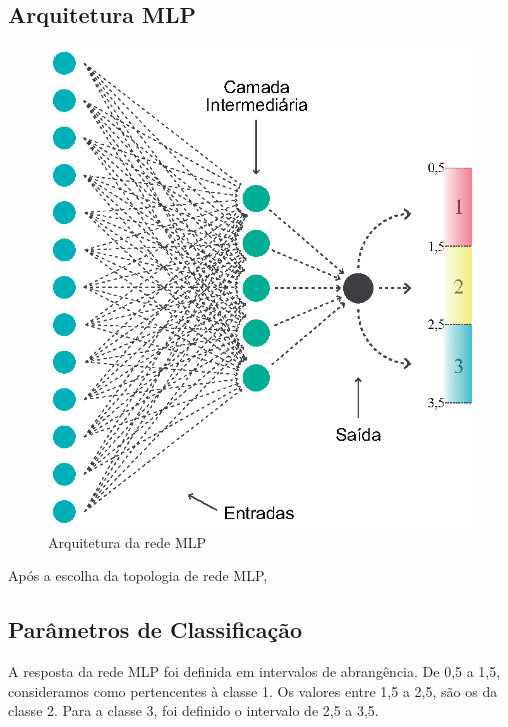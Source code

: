 \subsection{Arquitetura MLP}

\begin{figure}[H]

\centering %
\includegraphics{04-Figuras/Arquitetura-MPL}

\caption{Arquitetura da rede MLP}

\label{figura:arquiteturaMPL}

\end{figure}

Após a escolha da topologia de rede MLP, 



\subsection{Parâmetros de Classificação}



A resposta da rede MLP foi definida em intervalos de abrangência. De 0,5 a 1,5, consideramos como pertencentes à classe 1. Os valores entre 1,5 a 2,5, são os da classe 2. Para a classe 3, foi definido o intervalo de 2,5 a 3,5.

